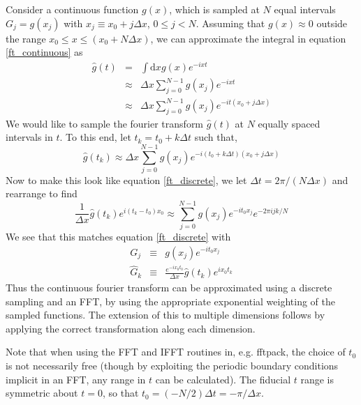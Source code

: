 \documentclass[12pt,preprint]{aastex}			%
\newcommand{\dd}{\mathrm{d}} %
\begin{document}
Consider a continuous function $g(x)$, which is sampled at $N$ equal intervals
$G_j = g(x_j)$ with $x_j \equiv x_0 + j\Delta x$, $0\le j<N$.  Assuming that
$g(x)\approx 0$ outside the range $x_0\le x \le (x_0+N\Delta x)$, we can
approximate the integral in equation \ref{ft_continuous} as
\begin{eqnarray}
  \hat{g}(t) &=& \int \dd x g(x)e^{-ixt}\nonumber\\
  &\approx& \Delta x\sum_{j=0}^{N-1}g(x_j)e^{-ixt}\nonumber\\
  &\approx& \Delta x\sum_{j=0}^{N-1}g(x_j)e^{-it(x_0+j\Delta x)}
\end{eqnarray}
We would like to sample the fourier transform $\hat g(t)$ at $N$ equally
spaced intervals in $t$.  To this end, let $t_k = t_0+k\Delta t$ such that,
\begin{equation}
  \hat{g}(t_k) 
  \approx \Delta x\sum_{j=0}^{N-1}g(x_j)
  e^{-i(t_0+k\Delta t)(x_0+j\Delta x)}
\end{equation}
Now to make this look like equation \ref{ft_discrete}, we let 
$\Delta t = 2\pi/(N\Delta x)$ and rearrange to find
\begin{equation}
  \frac{1}{\Delta x}\hat{g}(t_k) e^{i (t_k-t_0) x_0}
  \approx \sum_{j=0}^{N-1}g(x_j)e^{-it_0x_j}e^{-2\pi ijk/N}
\end{equation}
We see that this matches equation \ref{ft_discrete} with
\begin{eqnarray}
  G_j &\equiv& g(x_j)e^{-it_0x_j}\nonumber\\
  \hat{G}_k &\equiv& \frac{e^{-ix_0t_0}}{\Delta x}\hat{g}(t_k) e^{i x_0t_k}
\end{eqnarray}
Thus the continuous fourier transform can be approximated using a discrete
sampling and an FFT, by using the appropriate exponential weighting of
the sampled functions.  The extension of this to multiple dimensions 
follows by applying the correct transformation along each dimension.

Note that when using the FFT and IFFT routines in, e.g. fftpack, the choice
of $t_0$ is not necessarily free (though by exploiting the periodic boundary
conditions implicit in an FFT, any range in $t$ can be calculated).  
The fiducial $t$ range
is symmetric about $t=0$, so that $t_0 = (-N/2)\Delta t = -\pi/\Delta x$.
\end{document}

